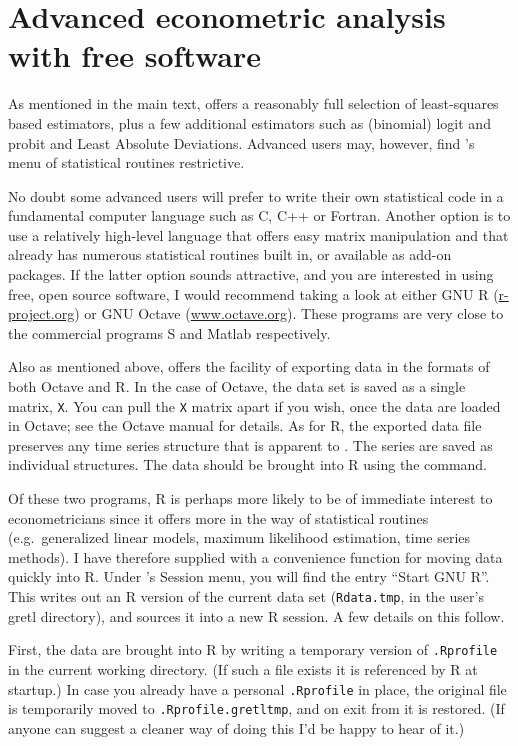 \chapter{Advanced econometric analysis with free software}
\label{app-advanced}

As mentioned in the main text,  offers a reasonably full
selection of least-squares based estimators, plus a few additional
estimators such as (binomial) logit and probit and Least Absolute
Deviations. Advanced users may, however, find 's menu of
statistical routines restrictive.

No doubt some advanced users will prefer to write their own
statistical code in a fundamental computer language such as C, C++ or
Fortran.  Another option is to use a relatively high-level language
that offers easy matrix manipulation and that already has numerous
statistical routines built in, or available as add-on packages. If the
latter option sounds attractive, and you are interested in using free,
open source software, I would recommend taking a look at either GNU R
(\href{http://www.r-project.org/}{r-project.org}) or GNU Octave
(\href{http://www.octave.org/}{www.octave.org}).  These programs are
very close to the commercial programs S and Matlab respectively.
  
Also as mentioned above,  offers the facility of exporting
data in the formats of both Octave and R.  In the case of Octave, the
 data set is saved as a single matrix, \verb+X+. You can
pull the \verb+X+ matrix apart if you wish, once the data are loaded
in Octave; see the Octave manual for details.  As for R, the exported
data file preserves any time series structure that is apparent to
.  The series are saved as individual structures. The data
should be brought into R using the  command.
  
Of these two programs, R is perhaps more likely to be of immediate
interest to econometricians since it offers more in the way of
statistical routines (e.g.\ generalized linear models, maximum
likelihood estimation, time series methods). I have therefore supplied
 with a convenience function for moving data quickly into
R. Under 's Session menu, you will find the entry ``Start
GNU R''.  This writes out an R version of the current  data
set (\verb+Rdata.tmp+, in the user's gretl directory), and sources it
into a new R session. A few details on this follow.
  
First, the data are brought into R by writing a temporary version of
\verb+.Rprofile+ in the current working directory.  (If such a file
exists it is referenced by R at startup.)  In case you already have a
personal \verb+.Rprofile+ in place, the original file is temporarily
moved to \verb+.Rprofile.gretltmp+, and on exit from  it is
restored.  (If anyone can suggest a cleaner way of doing this I'd be
happy to hear of it.)
  
